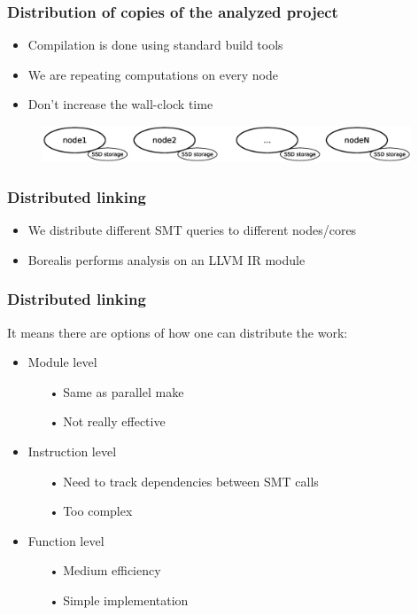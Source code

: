 \begin{frame}
\frametitle{Distribution of copies of the analyzed project}
\begin{itemize}
\item Compilation is done using standard build tools
\item We are repeating computations on every node
\item Don't increase the wall-clock time
\end{itemize}
	\begin{figure}
		\includegraphics[width=110mm]{image/compSource}
	\end{figure}	
\end{frame}

\begin{frame}
\frametitle{Distributed linking}
\begin{itemize}
	\item We distribute different SMT queries to different nodes/cores 
	\item Borealis performs analysis on an LLVM IR module
\end{itemize}
\end{frame}

\begin{frame}
\frametitle{Distributed linking}
It means there are options of how one can distribute the work:
\begin{itemize}
	\item Module level
	\begin{itemize}
	    \item[•] Same as parallel make
	    \item[•] Not really effective
	\end{itemize}
	\item Instruction level
		\begin{itemize}
	        \item[•] Need to track dependencies between SMT calls
	        \item[•] Too complex
		\end{itemize}
	\item Function level
	    \begin{itemize}
	        \item[•] Medium efficiency
	        \item[•] Simple implementation
	    \end{itemize}
\end{itemize}
\end{frame}

